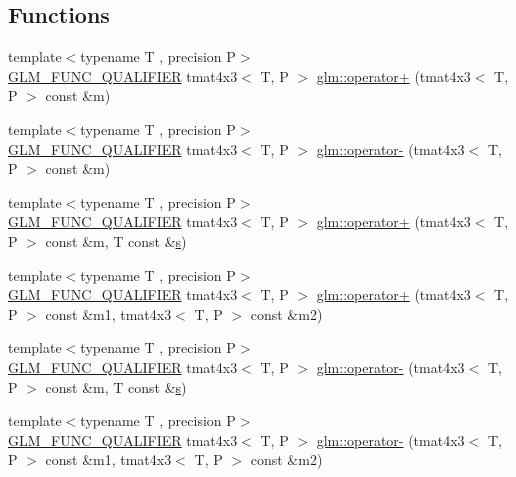 \subsection*{Functions}
\begin{DoxyCompactItemize}
\item 
{\footnotesize template$<$typename T , precision P$>$ }\\\mbox{\hyperlink{setup_8hpp_a33fdea6f91c5f834105f7415e2a64407}{G\+L\+M\+\_\+\+F\+U\+N\+C\+\_\+\+Q\+U\+A\+L\+I\+F\+I\+ER}} tmat4x3$<$ T, P $>$ \mbox{\hyperlink{namespaceglm_a60835fb1a69331ebbee568669fc918a0}{glm\+::operator+}} (tmat4x3$<$ T, P $>$ const \&m)
\item 
{\footnotesize template$<$typename T , precision P$>$ }\\\mbox{\hyperlink{setup_8hpp_a33fdea6f91c5f834105f7415e2a64407}{G\+L\+M\+\_\+\+F\+U\+N\+C\+\_\+\+Q\+U\+A\+L\+I\+F\+I\+ER}} tmat4x3$<$ T, P $>$ \mbox{\hyperlink{namespaceglm_a60d99cdce91f523e466b9c6fec36a763}{glm\+::operator-\/}} (tmat4x3$<$ T, P $>$ const \&m)
\item 
{\footnotesize template$<$typename T , precision P$>$ }\\\mbox{\hyperlink{setup_8hpp_a33fdea6f91c5f834105f7415e2a64407}{G\+L\+M\+\_\+\+F\+U\+N\+C\+\_\+\+Q\+U\+A\+L\+I\+F\+I\+ER}} tmat4x3$<$ T, P $>$ \mbox{\hyperlink{namespaceglm_a876e75ebc71288bb2eef6eb29918f14a}{glm\+::operator+}} (tmat4x3$<$ T, P $>$ const \&m, T const \&\mbox{\hyperlink{glad_8h_af1b1d5edfea6a34daee7389b1b5810ad}{s}})
\item 
{\footnotesize template$<$typename T , precision P$>$ }\\\mbox{\hyperlink{setup_8hpp_a33fdea6f91c5f834105f7415e2a64407}{G\+L\+M\+\_\+\+F\+U\+N\+C\+\_\+\+Q\+U\+A\+L\+I\+F\+I\+ER}} tmat4x3$<$ T, P $>$ \mbox{\hyperlink{namespaceglm_ac3869c4747532b81543c0bf725251546}{glm\+::operator+}} (tmat4x3$<$ T, P $>$ const \&m1, tmat4x3$<$ T, P $>$ const \&m2)
\item 
{\footnotesize template$<$typename T , precision P$>$ }\\\mbox{\hyperlink{setup_8hpp_a33fdea6f91c5f834105f7415e2a64407}{G\+L\+M\+\_\+\+F\+U\+N\+C\+\_\+\+Q\+U\+A\+L\+I\+F\+I\+ER}} tmat4x3$<$ T, P $>$ \mbox{\hyperlink{namespaceglm_afcb0d386fe4230e7be47ef8bc7eac70b}{glm\+::operator-\/}} (tmat4x3$<$ T, P $>$ const \&m, T const \&\mbox{\hyperlink{glad_8h_af1b1d5edfea6a34daee7389b1b5810ad}{s}})
\item 
{\footnotesize template$<$typename T , precision P$>$ }\\\mbox{\hyperlink{setup_8hpp_a33fdea6f91c5f834105f7415e2a64407}{G\+L\+M\+\_\+\+F\+U\+N\+C\+\_\+\+Q\+U\+A\+L\+I\+F\+I\+ER}} tmat4x3$<$ T, P $>$ \mbox{\hyperlink{namespaceglm_a3366016f32730b6590831628678f7a75}{glm\+::operator-\/}} (tmat4x3$<$ T, P $>$ const \&m1, tmat4x3$<$ T, P $>$ const \&m2)

\end{DoxyCompactItemize}
